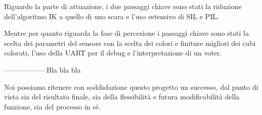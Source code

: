 \documentclass[12pt]{report}
\begin{document}
Riguardo la parte di attuazione, i due passaggi chiave sono stati la riduzione dell'algoritmo IK a quello di uno scara e l'uso estensivo di SIL e PIL.

Mentre per quanto riguarda la fase di percezione i passaggi chiave sono stati la scelta dei parametri del sensore con la scelta dei colori e finiture migliori dei cubi colorati, l'uso della UART per il debug e l'interpretazione di un voter.

------------------Bla bla bla

Noi possiamo ritenere con soddisfazione questo progetto un successo, dal punto di vista sia del risultato finale, sia della flessibilità e futura modificabilità della funzione, sia del processo in sé.
\end{document}

